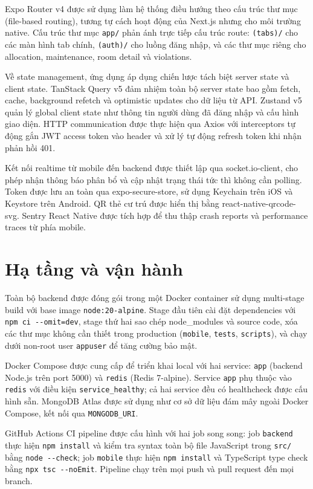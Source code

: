 ﻿\documentclass[a4paper,12pt,openany,oneside]{report}
\begin{document}
Expo Router v4 được sử dụng làm hệ thống điều hướng theo cấu trúc thư mục
(file-based routing), tương tự cách hoạt động của Next.js nhưng cho môi trường
native. Cấu trúc thư mục \texttt{app/} phản ánh trực tiếp cấu trúc route:
\texttt{(tabs)/} cho các màn hình tab chính, \texttt{(auth)/} cho luồng đăng
nhập, và các thư mục riêng cho allocation, maintenance, room detail và
violations.

Về state management, ứng dụng áp dụng chiến lược tách biệt server state và
client state. TanStack Query v5 đảm nhiệm toàn bộ server state bao gồm fetch,
cache, background refetch và optimistic updates cho dữ liệu từ API. Zustand v5
quản lý global client state như thông tin người dùng đã đăng nhập và cấu hình
giao diện. HTTP communication được thực hiện qua Axios với interceptors tự động
gắn JWT access token vào header và xử lý tự động refresh token khi nhận phản
hồi 401.

Kết nối realtime từ mobile đến backend được thiết lập qua socket.io-client, cho
phép nhận thông báo phân bổ và cập nhật trạng thái tức thì không cần polling.
Token được lưu an toàn qua expo-secure-store, sử dụng Keychain trên iOS và
Keystore trên Android. QR thẻ cư trú được hiển thị bằng react-native-qrcode-svg.
Sentry React Native được tích hợp để thu thập crash reports và performance traces
từ phía mobile.

\section{Hạ tầng và vận hành}

Toàn bộ backend được đóng gói trong một Docker container sử dụng multi-stage
build với base image \texttt{node:20-alpine}. Stage đầu tiên cài đặt
dependencies với \texttt{npm ci -{}-omit=dev}, stage thứ hai sao chép
node\_modules và source code, xóa các thư mục không cần thiết trong production
(\texttt{mobile}, \texttt{tests}, \texttt{scripts}), và chạy dưới non-root user
\texttt{appuser} để tăng cường bảo mật.

Docker Compose được cung cấp để triển khai local với hai service: \texttt{app}
(backend Node.js trên port 5000) và \texttt{redis} (Redis 7-alpine). Service
\texttt{app} phụ thuộc vào \texttt{redis} với điều kiện \texttt{service\_healthy};
cả hai service đều có healthcheck được cấu hình sẵn. MongoDB Atlas được sử dụng
như cơ sở dữ liệu đám mây ngoài Docker Compose, kết nối qua \texttt{MONGODB\_URI}.

GitHub Actions CI pipeline được cấu hình với hai job song song: job
\texttt{backend} thực hiện \texttt{npm install} và kiểm tra syntax toàn bộ file
JavaScript trong \texttt{src/} bằng \texttt{node -{}-check}; job \texttt{mobile}
thực hiện \texttt{npm install} và TypeScript type check bằng \texttt{npx tsc
-{}-noEmit}. Pipeline chạy trên mọi push và pull request đến mọi branch.
\end{document}
